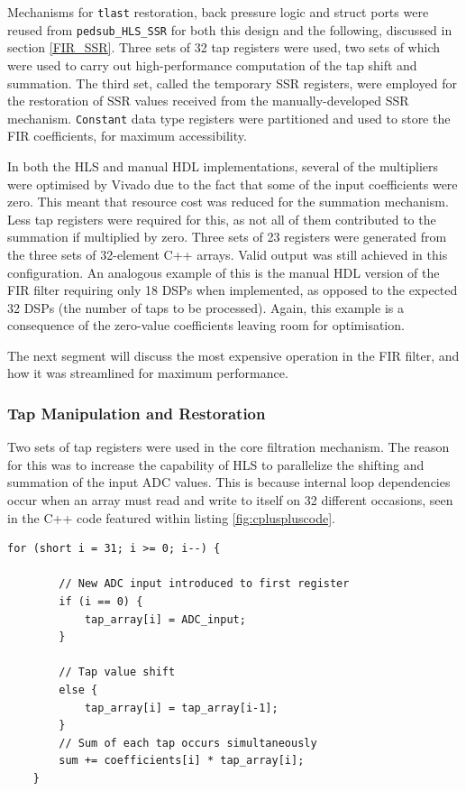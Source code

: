 \documentclass[10pt]{article}
\begin{document}
Mechanisms for \texttt{tlast} restoration, back pressure logic and struct ports were reused from \texttt{pedsub\_HLS\_SSR} for both this design and the following, discussed in section \ref{FIR_SSR}. Three sets of 32 tap registers were used, two sets of which were used to carry out high-performance computation of the tap shift and summation. The third set, called the temporary SSR registers, were employed for the restoration of SSR values received from the manually-developed SSR mechanism. \texttt{Constant} data type registers were partitioned and used to store the FIR coefficients, for maximum accessibility.

In both the HLS and manual HDL implementations, several of the multipliers were optimised by Vivado due to the fact that some of the input coefficients were zero. This meant that resource cost was reduced for the summation mechanism. Less tap registers were required for this, as not all of them contributed to the summation if multiplied by zero. Three sets of 23 registers were generated from the three sets of 32-element C++ arrays. Valid output was still achieved in this configuration. An analogous example of this is the manual HDL version of the FIR filter requiring only 18 DSPs when implemented, as opposed to the expected 32 DSPs (the number of taps to be processed). Again, this example is a consequence of the zero-value coefficients leaving room for optimisation.

The next segment will discuss the most expensive operation in the FIR filter, and how it was streamlined for maximum performance.

\subsubsection*{Tap Manipulation and Restoration} 

Two sets of tap registers were used in the core filtration mechanism. The reason for this was to increase the capability of HLS to parallelize the shifting and summation of the input ADC values. This is because internal loop dependencies occur when an array must read and write to itself on 32 different occasions, seen in the C++ code featured within listing \ref{fig:cpluspluscode}.


\begin{lstlisting}[caption={The \texttt{for} loop responsible for the tap shift and summation in C++, using only one set of tap registers}, label = {fig:cpluspluscode}]
	for (short i = 31; i >= 0; i--) {
	
		// New ADC input introduced to first register
		if (i == 0) {
			tap_array[i] = ADC_input;
		}
	
		// Tap value shift
		else {
			tap_array[i] = tap_array[i-1];
		}
		// Sum of each tap occurs simultaneously
		sum += coefficients[i] * tap_array[i];
	}
\end{lstlisting}
\end{document}
